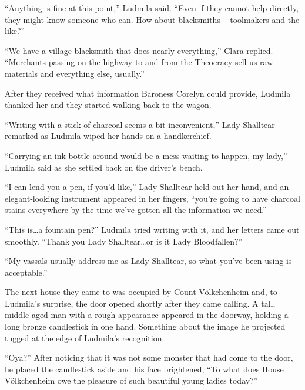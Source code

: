  

“Anything is fine at this point,” Ludmila said. “Even if they cannot help directly, they might know someone who can. How about blacksmiths – toolmakers and the like?”

 

“We have a village blacksmith that does nearly everything,” Clara replied. “Merchants passing on the highway to and from the Theocracy sell us raw materials and everything else, usually.”

 

After they received what information Baroness Corelyn could provide, Ludmila thanked her and they started walking back to the wagon.

 

“Writing with a stick of charcoal seems a bit inconvenient,” Lady Shalltear remarked as Ludmila wiped her hands on a handkerchief.

 

“Carrying an ink bottle around would be a mess waiting to happen, my lady,” Ludmila said as she settled back on the driver’s bench.

 

“I can lend you a pen, if you’d like,” Lady Shalltear held out her hand, and an elegant-looking instrument appeared in her fingers, “you're going to have charcoal stains everywhere by the time we’ve gotten all the information we need.”

 

“This is…a fountain pen?” Ludmila tried writing with it, and her letters came out smoothly. “Thank you Lady Shalltear…or is it Lady Bloodfallen?”

 

“My vassals usually address me as Lady Shalltear, so what you’ve been using is acceptable.”

 

The next house they came to was occupied by Count Völkchenheim and, to Ludmila’s surprise, the door opened shortly after they came calling. A tall, middle-aged man with a rough appearance appeared in the doorway, holding a long bronze candlestick in one hand. Something about the image he projected tugged at the edge of Ludmila’s recognition.

 

“Oya?” After noticing that it was not some monster that had come to the door, he placed the candlestick aside and his face brightened, “To what does House Völkchenheim owe the pleasure of such beautiful young ladies today?”

